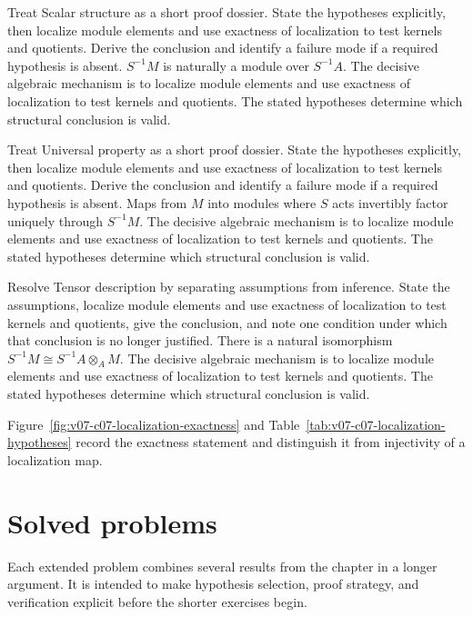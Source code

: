 \begin{example}\label{ex:v07-worked-02}
Treat Scalar structure as a short proof dossier. State the hypotheses explicitly, then localize module elements and use exactness of localization to test kernels and quotients. Derive the conclusion and identify a failure mode if a required hypothesis is absent. $S^{-1}M$ is naturally a module over $S^{-1}A$. The decisive algebraic mechanism is to localize module elements and use exactness of localization to test kernels and quotients. The stated hypotheses determine which structural conclusion is valid.
\end{example}

\begin{example}\label{ex:v07-worked-03}
Treat Universal property as a short proof dossier. State the hypotheses explicitly, then localize module elements and use exactness of localization to test kernels and quotients. Derive the conclusion and identify a failure mode if a required hypothesis is absent. Maps from $M$ into modules where $S$ acts invertibly factor uniquely through $S^{-1}M$. The decisive algebraic mechanism is to localize module elements and use exactness of localization to test kernels and quotients. The stated hypotheses determine which structural conclusion is valid.
\end{example}

\begin{example}\label{ex:v07-worked-04}
Resolve Tensor description by separating assumptions from inference. State the assumptions, localize module elements and use exactness of localization to test kernels and quotients, give the conclusion, and note one condition under which that conclusion is no longer justified. There is a natural isomorphism $S^{-1}M\cong S^{-1}A\otimes_A M$. The decisive algebraic mechanism is to localize module elements and use exactness of localization to test kernels and quotients. The stated hypotheses determine which structural conclusion is valid.
\end{example}


Figure~\ref{fig:v07-c07-localization-exactness} and Table~\ref{tab:v07-c07-localization-hypotheses}
record the exactness statement and distinguish it from injectivity of a localization map.


\section{Solved problems}
Each extended problem combines several results from the chapter in a longer argument. It is intended to make hypothesis selection, proof strategy, and verification explicit before the shorter exercises begin.

